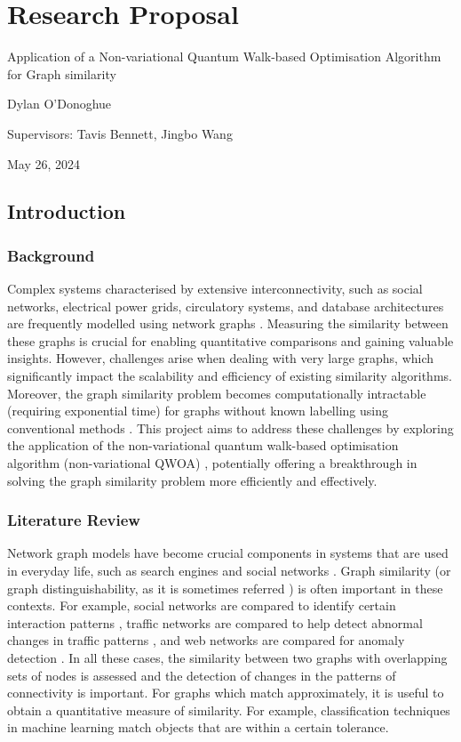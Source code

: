 \chapter{Research Proposal}

\begin{center}
    \Large Application of a Non-variational Quantum Walk-based Optimisation Algorithm for Graph similarity

    \large Dylan O'Donoghue

    Supervisors: Tavis Bennett, Jingbo Wang

    May 26, 2024
\end{center}

\section{Introduction}
\subsection{Background}
Complex systems characterised by extensive interconnectivity, such as social networks, electrical power grids, circulatory systems, and database architectures are frequently modelled using network graphs \cite{databases}. Measuring the similarity between these graphs is crucial for enabling quantitative comparisons and gaining valuable insights. However, challenges arise when dealing with very large graphs, which significantly impact the scalability and efficiency of existing similarity algorithms. Moreover, the graph similarity problem becomes computationally intractable (requiring exponential time) for graphs without known labelling using conventional methods \cite{how_similar}. This project aims to address these challenges by exploring the application of the non-variational quantum walk-based optimisation algorithm (non-variational QWOA) \cite{bennett2024nonvariational}, potentially offering a breakthrough in solving the graph similarity problem more efficiently and effectively.

\subsection{Literature Review}
Network graph models have become crucial components in systems that are used in everyday life, such as search engines and social networks \cite{social-networks}. Graph similarity (or graph distinguishability, as it is sometimes referred \cite{quantum-distinguishability}) is often important in these contexts. For example, social networks are compared to identify certain interaction patterns \cite{citation-space}, traffic networks are compared to help detect abnormal changes in traffic patterns \cite{traffic}, and web networks are compared for anomaly detection \cite{web-anomalies}. In all these cases, the similarity between two graphs with overlapping sets of nodes is assessed and the detection of changes in the patterns of connectivity is important. For graphs which match approximately, it is useful to obtain a quantitative measure of similarity. For example, classification techniques in machine learning match objects that are within a certain tolerance.

